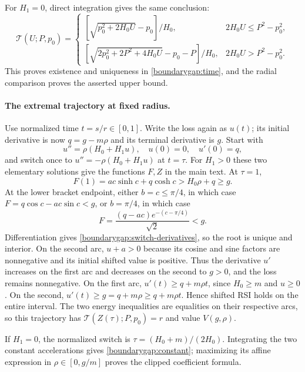 For $H_1=0$, direct integration gives the same conclusion:
\[
 \mathcal T(U;P,p_0)=
 \begin{cases}
 [\sqrt{p_0^2+2H_0U}-p_0]/H_0,
       &2H_0U\le P^2-p_0^2,\\[1mm]
 [\sqrt{2p_0^2+2P^2+4H_0U}-p_0-P]/H_0,
       &2H_0U>P^2-p_0^2.
 \end{cases}
\]
This proves existence and uniqueness in \eqref{boundarygap:time}, and
the radial comparison proves the asserted upper bound.

\paragraph{The extremal trajectory at fixed radius.}
Use normalized time $t=s/r\in[0,1]$.  Write the loss again as $u(t)$;
its initial derivative is now $q=g-m\rho$ and its terminal derivative
is $g$.  Start with
\[
 u''=\rho(H_0+H_1u),\quad u(0)=0,\quad u'(0)=q,
\]
and switch once to $u''=-\rho(H_0+H_1u)$ at $t=\tau$.
For $H_1>0$ these two elementary solutions give the functions $F,Z$
in the main text.  At $\tau=1$,
\[
 F(1)=ac\sinh c+q\cosh c>H_0\rho+q\ge g.
\]
At the lower bracket endpoint, either $b=c\le\pi/4$, in which case
$F=q\cos c-ac\sin c<g$, or $b=\pi/4$, in which case
\[
 F=\frac{(q-ac)e^{-(c-\pi/4)}}{\sqrt2}<g.
\]
Differentiation gives \eqref{boundarygap:switch-derivatives}, so the
root is unique and interior.  On the second arc, $u+a>0$ because its
cosine and sine factors are nonnegative and its initial shifted value
is positive.  Thus the derivative $u'$ increases on the first arc and
decreases on the second to $g>0$, and the loss remains nonnegative.
On the first arc,
$u'(t)\ge q+m\rho t$, since $H_0\ge m$ and $u\ge0$.
On the second, $u'(t)\ge g=q+m\rho\ge q+m\rho t$.
Hence shifted RSI holds on the entire interval.  The two energy
inequalities are equalities on their respective arcs, so this
trajectory has $\mathcal T(Z(\tau);P,p_0)=r$ and value $V(g,\rho)$.

If $H_1=0$, the normalized switch is
$\tau=(H_0+m)/(2H_0)$.  Integrating the two constant accelerations gives
\eqref{boundarygap:constant}; maximizing its affine expression in
$\rho\in[0,g/m]$ proves the clipped coefficient formula.

